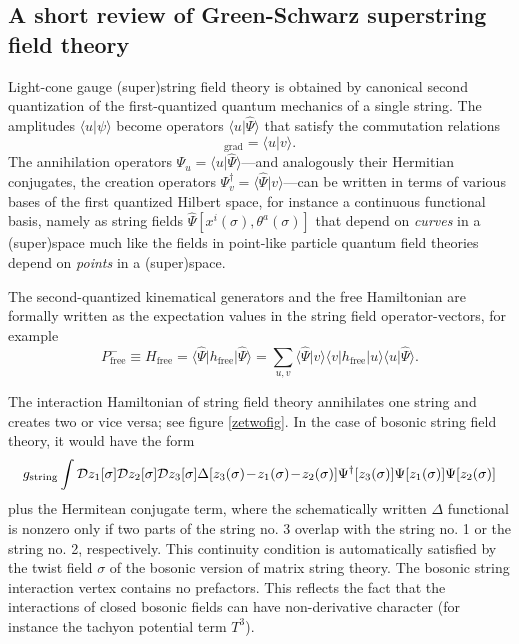 \documentclass[nohyper,12pt,letterpaper]{JHEP3}
\def\calD{{\cal D}}
\def \eqn#1#2{\begin{equation}#2\label{#1}\end{equation}}
\def \gs{g_{\mathrm{string}}}
\begin{document}
\subsection{A short review of Green-Schwarz superstring field theory}

Light-cone gauge (super)string field theory is obtained by canonical 
second quantization of the first-quantized quantum mechanics of a single 
string. The amplitudes $\langle u|\psi\rangle$ become operators
$\langle u|\hat\Psi\rangle$ that satisfy the commutation relations
\eqn{secondquan}{[\langle u|\hat\Psi\rangle\, , \,
\langle\hat\Psi| v\rangle]_{\mathrm{grad}} = 
\langle u|v\rangle.}
The annihilation operators $\Psi_u=
\langle u|\hat\Psi\rangle$---and analogously
their Hermitian conjugates, the creation operators $\Psi^\dagger_v=
\langle\hat\Psi| v\rangle$---can be written in terms of various bases
of the first quantized Hilbert space,
for instance a continuous
functional basis, namely as string fields $\hat\Psi[x^i(\sigma),
\theta^a(\sigma)]$ that depend on {\it curves} in a (super)space
much like the fields in point-like particle quantum field theories depend
on {\it points} in a (super)space.

The second-quantized kinematical generators and the free Hamiltonian are 
formally written as the expectation values
in the string field operator-vectors, for example
\eqn{secop}{P^-_{\mathrm{free}}\equiv
H_{\mathrm{free}} = 
\langle \hat\Psi | h_{\mathrm{free}}|\hat \Psi\rangle
=\sum_{u,v}
\langle \hat\Psi |v\rangle\langle v| h_{\mathrm{free}}|u\rangle\langle u|
\hat \Psi\rangle
.}


The interaction Hamiltonian of string field theory annihilates one
string and creates two or vice versa; see figure \ref{zetwofig}. In
the
case of bosonic string field theory, it would have the form
\eqn{bosonich}{\gs\int \calD z_1[\sigma]
\calD z_2[\sigma]
\calD z_3[\sigma]
\Delta[z_3(\sigma)\!-\!z_1(\sigma)\!-\!z_2(\sigma)]
\Psi^\dagger[z_3(\sigma)]
\Psi[z_1(\sigma)]\Psi[z_2(\sigma)]
}
%
plus the Hermitean conjugate term, where the schematically written
$\Delta$ functional is nonzero only if two parts of the string no. 3
overlap with the string no. 1 or the string no. 2, respectively.  This
continuity condition is automatically satisfied by the twist field
$\sigma$ of the bosonic version of matrix string theory. The bosonic
string interaction vertex contains no prefactors. This reflects the
fact that the interactions of closed bosonic fields can have
non-derivative character (for instance the tachyon potential term
$T^3$).
\end{document}
